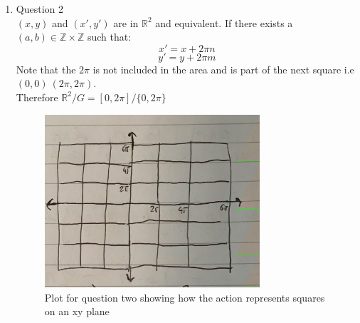 \documentclass[12pt]{article}
\newcommand{\R} {\mathbb{R}}
\begin{document}
\begin{enumerate}
\begin{enumerate}
\end{enumerate}
 \item Question 2
 \\
$(x,y)$ and $(x', y')$ are in $\R^2 $ and equivalent. If there exists a $(a,b) \in \mathbb{Z} \times \mathbb{Z} $ such that:
$$ x' = x + 2 \pi n $$
$$ y' = y + 2 \pi m $$
Note that the $2\pi$ is not included in the area and is part of the next square i.e $(0,0) ~ (2\pi , 2\pi )$. \\
Therefore $\R^2 / G = [0,2\pi] / \{0,2\pi\} $
\begin{figure}[h]
   \centering \includegraphics[width=8cm]{plot.jpg}
   \caption{Plot for question two showing how the action represents squares on an xy plane}
   \end{figure}


\end{enumerate}
\end{document}
